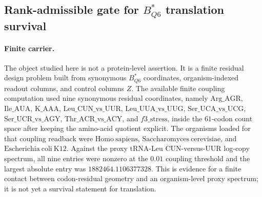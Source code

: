 \subsection{Rank-admissible gate for $B^{*}_{Q6}$ translation survival}
\label{subsec:q6-rank-admissible-translation-survival-gate-cross-layer}

\paragraph{Finite carrier.}
The object studied here is not a protein-level assertion.  It is a finite residual design problem built from synonymous $B^{*}_{Q6}$ coordinates, organism-indexed readout columns, and control columns $Z$.  The available finite coupling computation used nine synonymous residual coordinates, namely $\mathrm{Arg\_AGR}$, $\mathrm{Ile\_AUA}$, $\mathrm{K\_AAA}$, $\mathrm{Leu\_CUN\_vs\_UUR}$, $\mathrm{Leu\_UUA\_vs\_UUG}$, $\mathrm{Ser\_UCA\_vs\_UCG}$, $\mathrm{Ser\_UCR\_vs\_AGY}$, $\mathrm{Thr\_ACR\_vs\_ACY}$, and $f3\_\mathrm{stress}$, inside the $61$-codon count space after keeping the amino-acid quotient explicit.  The organisms loaded for that coupling readback were $\mathrm{Homo\ sapiens}$, $\mathrm{Saccharomyces\ cerevisiae}$, and $\mathrm{Escherichia\ coli\ K12}$.  Against the proxy tRNA-Leu $\mathrm{CUN}$-versus-$\mathrm{UUR}$ log-copy spectrum, all nine entries were nonzero at the $0.01$ coupling threshold and the largest absolute entry was $1882464.1106377328$.  This is evidence for a finite contact between codon-residual geometry and an organism-level proxy spectrum; it is not yet a survival statement for translation.

